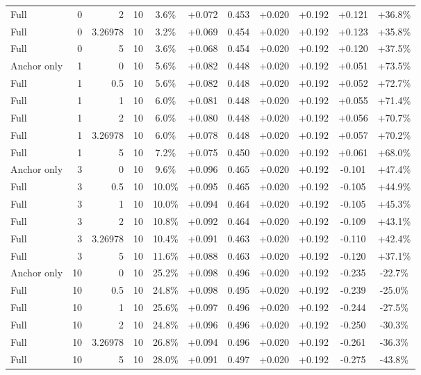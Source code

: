 \begin{table}[htbp]
\begin{tabular}{lrrrccccccc}
Full & 0 & 2 & 10 & 3.6\% & +0.072 & 0.453 & +0.020 & +0.192 & +0.121 & +36.8\% \\
Full & 0 & 3.26978 & 10 & 3.2\% & +0.069 & 0.454 & +0.020 & +0.192 & +0.123 & +35.8\% \\
Full & 0 & 5 & 10 & 3.6\% & +0.068 & 0.454 & +0.020 & +0.192 & +0.120 & +37.5\% \\
Anchor only & 1 & 0 & 10 & 5.6\% & +0.082 & 0.448 & +0.020 & +0.192 & +0.051 & +73.5\% \\
Full & 1 & 0.5 & 10 & 5.6\% & +0.082 & 0.448 & +0.020 & +0.192 & +0.052 & +72.7\% \\
Full & 1 & 1 & 10 & 6.0\% & +0.081 & 0.448 & +0.020 & +0.192 & +0.055 & +71.4\% \\
Full & 1 & 2 & 10 & 6.0\% & +0.080 & 0.448 & +0.020 & +0.192 & +0.056 & +70.7\% \\
Full & 1 & 3.26978 & 10 & 6.0\% & +0.078 & 0.448 & +0.020 & +0.192 & +0.057 & +70.2\% \\
Full & 1 & 5 & 10 & 7.2\% & +0.075 & 0.450 & +0.020 & +0.192 & +0.061 & +68.0\% \\
Anchor only & 3 & 0 & 10 & 9.6\% & +0.096 & 0.465 & +0.020 & +0.192 & -0.101 & +47.4\% \\
Full & 3 & 0.5 & 10 & 10.0\% & +0.095 & 0.465 & +0.020 & +0.192 & -0.105 & +44.9\% \\
Full & 3 & 1 & 10 & 10.0\% & +0.094 & 0.464 & +0.020 & +0.192 & -0.105 & +45.3\% \\
Full & 3 & 2 & 10 & 10.8\% & +0.092 & 0.464 & +0.020 & +0.192 & -0.109 & +43.1\% \\
Full & 3 & 3.26978 & 10 & 10.4\% & +0.091 & 0.463 & +0.020 & +0.192 & -0.110 & +42.4\% \\
Full & 3 & 5 & 10 & 11.6\% & +0.088 & 0.463 & +0.020 & +0.192 & -0.120 & +37.1\% \\
Anchor only & 10 & 0 & 10 & 25.2\% & +0.098 & 0.496 & +0.020 & +0.192 & -0.235 & -22.7\% \\
Full & 10 & 0.5 & 10 & 24.8\% & +0.098 & 0.495 & +0.020 & +0.192 & -0.239 & -25.0\% \\
Full & 10 & 1 & 10 & 25.6\% & +0.097 & 0.496 & +0.020 & +0.192 & -0.244 & -27.5\% \\
Full & 10 & 2 & 10 & 24.8\% & +0.096 & 0.496 & +0.020 & +0.192 & -0.250 & -30.3\% \\
Full & 10 & 3.26978 & 10 & 26.8\% & +0.094 & 0.496 & +0.020 & +0.192 & -0.261 & -36.3\% \\
Full & 10 & 5 & 10 & 28.0\% & +0.091 & 0.497 & +0.020 & +0.192 & -0.275 & -43.8\% \\

\end{tabular}
\end{table}
